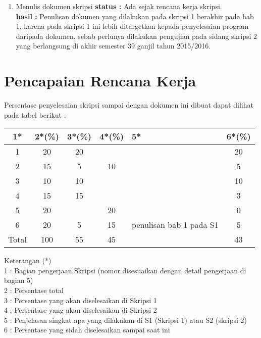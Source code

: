\documentclass[a4paper,twoside]{article}
\begin{document}
\begin{enumerate}
		\item Menulis dokumen skripsi
		{\bf status :} Ada sejak rencana kerja skripsi.\\
		{\bf hasil :} Penulisan dokumen yang dilakukan pada skripsi 1 berakhir pada bab 1, karena pada skripsi 1 ini lebih ditargetkan kepada penyelesaian program daripada dokumen, sebab perlunya dilakukan pengujian pada sidang skripsi 2 yang berlangsung di akhir semester 39 ganjil tahun 2015/2016. 
	
	\end{enumerate}

\section{Pencapaian Rencana Kerja}
Persentase penyelesaian skripsi sampai dengan dokumen ini dibuat dapat dilihat pada tabel berikut :

\begin{center}
  \begin{tabular}{ | c | c | c | c | l | c |}
    \hline
    1*  & 2*(\%) & 3*(\%) & 4*(\%) &5* &6*(\%)\\ \hline \hline
    1   & 20  & 20  &  & & 20 \\ \hline
    2   & 15 & 5  & 10  & & 5 \\ \hline
    3   & 10  & 10  &  &  & 10 \\ \hline
    4   & 15  & 15  &   &  & 3 \\ \hline
    5   & 20 &   & 20 & & 0 \\ \hline
    6   & 20 & 	5 & 15  & {\footnotesize penulisan bab 1 pada S1}  & 5 \\\hline
    Total  & 100  & 55  & 45 &  & 43\\ \hline
                          \end{tabular}
\end{center}

Keterangan (*)\\
1 : Bagian pengerjaan Skripsi (nomor disesuaikan dengan detail pengerjaan di bagian 5)\\
2 : Persentase total \\
3 : Persentase yang akan diselesaikan di Skripsi 1 \\
4 : Persentase yang akan diselesaikan di Skripsi 2 \\
5 : Penjelasan singkat apa yang dilakukan di S1 (Skripsi 1) atau S2 (skripsi 2)\\
6 : Persentase yang sidah diselesaikan sampai saat ini 
\end{document}
